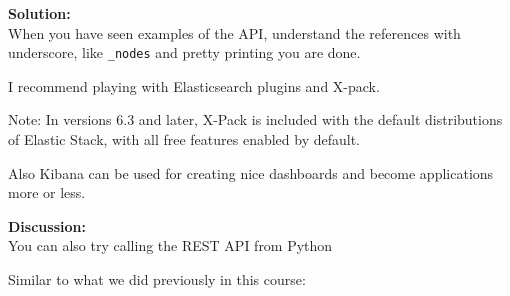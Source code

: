 \documentclass[a4paper,11pt,notitlepage]{report}
\begin{document}
{\bf Solution:}\\
When you have seen examples of the API, understand the references with underscore, like \verb+_nodes+ and pretty printing you are done.

I recommend playing with Elasticsearch plugins and X-pack.\\

Note: In versions 6.3 and later, X-Pack is included with the default distributions of Elastic Stack, with all free features enabled by default.

Also Kibana can be used for creating nice dashboards and become applications more or less.

{\bf Discussion:}\\
You can also try calling the REST API from Python

Similar to what we did previously in this course:
\inputminted{python}{programs/rest-1.py}
\end{document}
